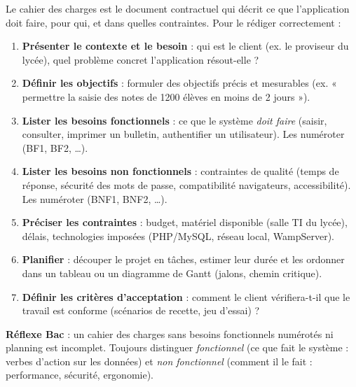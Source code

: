 \documentclass[11pt]{article}
\newcommand{\cle}[1]{{\popxbold\color{popdark}#1}}
\begin{document}
\begin{methode}
Le \cle{cahier des charges} est le document contractuel qui décrit ce que l'application doit faire, pour qui, et dans quelles contraintes. Pour le rédiger correctement :
\begin{enumerate}
\item \textbf{Présenter le contexte et le besoin} : qui est le client (ex. le proviseur du lycée), quel problème concret l'application résout-elle ?
\item \textbf{Définir les objectifs} : formuler des objectifs précis et mesurables (ex. « permettre la saisie des notes de 1200 élèves en moins de 2 jours »).
\item \textbf{Lister les besoins fonctionnels} : ce que le système \emph{doit faire} (saisir, consulter, imprimer un bulletin, authentifier un utilisateur). Les numéroter (BF1, BF2, \dots).
\item \textbf{Lister les besoins non fonctionnels} : contraintes de qualité (temps de réponse, sécurité des mots de passe, compatibilité navigateurs, accessibilité). Les numéroter (BNF1, BNF2, \dots).
\item \textbf{Préciser les contraintes} : budget, matériel disponible (salle TI du lycée), délais, technologies imposées (PHP/MySQL, réseau local, WampServer).
\item \textbf{Planifier} : découper le projet en tâches, estimer leur durée et les ordonner dans un tableau ou un diagramme de Gantt (jalons, chemin critique).
\item \textbf{Définir les critères d'acceptation} : comment le client vérifiera-t-il que le travail est conforme (scénarios de recette, jeu d'essai) ?
\end{enumerate}
\textbf{Réflexe Bac} : un cahier des charges sans besoins fonctionnels numérotés ni planning est incomplet. Toujours distinguer \emph{fonctionnel} (ce que fait le système : verbes d'action sur les données) et \emph{non fonctionnel} (comment il le fait : performance, sécurité, ergonomie).
\end{methode}
\end{document}
